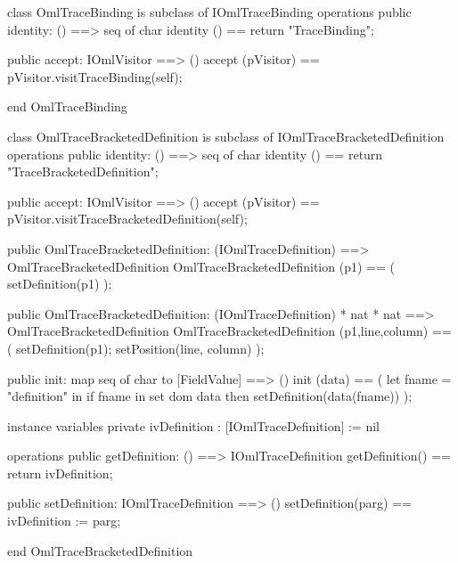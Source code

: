 \begin{vdm_al}
class OmlTraceBinding is subclass of IOmlTraceBinding
operations
  public identity: () ==> seq of char
  identity () == return "TraceBinding";

  public accept: IOmlVisitor ==> ()
  accept (pVisitor) == pVisitor.visitTraceBinding(self);

end OmlTraceBinding
\end{vdm_al}
\begin{vdm_al}
class OmlTraceBracketedDefinition is subclass of IOmlTraceBracketedDefinition
operations
  public identity: () ==> seq of char
  identity () == return "TraceBracketedDefinition";

  public accept: IOmlVisitor ==> ()
  accept (pVisitor) == pVisitor.visitTraceBracketedDefinition(self);

  public OmlTraceBracketedDefinition:
    (IOmlTraceDefinition) ==> OmlTraceBracketedDefinition
  OmlTraceBracketedDefinition (p1) == 
    ( setDefinition(p1) );

  public OmlTraceBracketedDefinition:
    (IOmlTraceDefinition) *
    nat *
    nat ==> OmlTraceBracketedDefinition
  OmlTraceBracketedDefinition (p1,line,column) == 
    ( setDefinition(p1);
      setPosition(line, column) );

  public init: map seq of char to [FieldValue] ==> ()
  init (data) ==
    ( let fname = "definition" in
        if fname in set dom data
        then setDefinition(data(fname)) );

instance variables
  private ivDefinition : [IOmlTraceDefinition] := nil

operations
  public getDefinition: () ==> IOmlTraceDefinition
  getDefinition() == return ivDefinition;

  public setDefinition: IOmlTraceDefinition ==> ()
  setDefinition(parg) == ivDefinition := parg;

end OmlTraceBracketedDefinition
\end{vdm_al}

